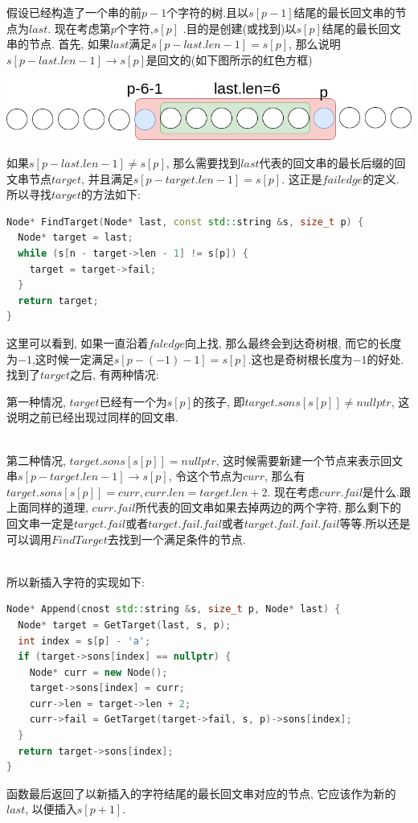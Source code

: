 \documentclass{article}
\begin{document}
假设已经构造了一个串的前$p-1$个字符的树.且以$s[p-1]$结尾的最长回文串的节点为$last$. 现在考虑第$p$个字符,$s[p]$ .目的是创建(或找到)以$s[p]$结尾的最长回文串的节点. 首先, 如果$last$满足$s[p-last.len-1]=s[p]$, 那么说明$s[p-last.len-1]\rightarrow  s[p]$是回文的(如下图所示的红色方框) \par
\includegraphics[scale=0.6]{pic5.png} \par
如果$s[p-last.len-1]\neq s[p]$, 那么需要找到$last$代表的回文串的最长后缀的回文串节点$target$, 并且满足$s[p-target.len-1]=s[p]$. 这正是$failedge$的定义. 所以寻找$target$的方法如下:
\begin{lstlisting}[language=C++, caption={FindTarget}]
Node* FindTarget(Node* last, const std::string &s, size_t p) {
  Node* target = last;
  while (s[n - target->len - 1] != s[p]) {
    target = target->fail;
  }
  return target;
}
\end{lstlisting}
这里可以看到, 如果一直沿着$faledge$向上找, 那么最终会到达奇树根, 而它的长度为$-1$,这时候一定满足$s[p-(-1)-1]=s[p]$.这也是奇树根长度为$-1$的好处.
找到了$target$之后, 有两种情况: \par
第一种情况, $target$已经有一个为$s[p]$的孩子, 即$target.sons[s[p]]\neq nullptr$, 这说明之前已经出现过同样的回文串. \par
~\\
第二种情况, $target.sons[s[p]]= nullptr$, 这时候需要新建一个节点来表示回文串$s[p-target.len-1]\rightarrow  s[p]$, 令这个节点为$curr$, 那么有$target.sons[s[p]]=curr, curr.len=target.len + 2$. 现在考虑$curr.fail$是什么.跟上面同样的道理, $curr.fail$所代表的回文串如果去掉两边的两个字符, 那么剩下的回文串一定是$target.fail$或者$target.fail.fail$或者$target.fail.fail.fail$等等.所以还是可以调用$FindTarget$去找到一个满足条件的节点. \par
~\\
所以新插入字符的实现如下:
\begin{lstlisting}[language=C++, caption={Append}]
Node* Append(cnost std::string &s, size_t p, Node* last) {
  Node* target = GetTarget(last, s, p);
  int index = s[p] - 'a'; 
  if (target->sons[index] == nullptr) {
    Node* curr = new Node();
    target->sons[index] = curr;
    curr->len = target->len + 2;
    curr->fail = GetTarget(target->fail, s, p)->sons[index];
  }
  return target->sons[index];
}
\end{lstlisting}
函数最后返回了以新插入的字符结尾的最长回文串对应的节点, 它应该作为新的$last$, 以便插入$s[p+1]$.
\end{document}
